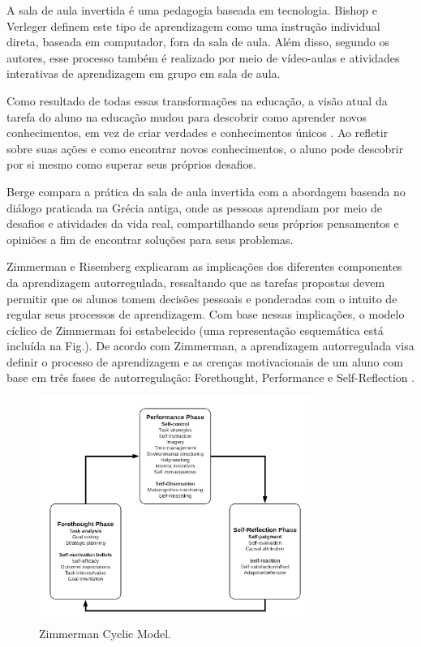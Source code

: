 A sala de aula invertida é uma pedagogia baseada em tecnologia. Bishop e Verleger\cite {bishop_flipped_2013} definem este tipo de aprendizagem como uma instrução individual direta, baseada em computador, fora da sala de aula. Além disso, segundo os autores, esse processo também é realizado por meio de vídeo-aulas e atividades interativas de aprendizagem em grupo em sala de aula.

Como resultado de todas essas transformações na educação, a visão atual da tarefa do aluno na educação mudou para descobrir como aprender novos conhecimentos, em vez de criar verdades e conhecimentos únicos \cite{ebert_school_2013}. Ao refletir sobre suas ações e como encontrar novos conhecimentos, o aluno pode descobrir por si mesmo como superar seus próprios desafios.

Berge\cite{berge_computer_1995} compara a prática da sala de aula invertida com a abordagem baseada no diálogo praticada na Grécia antiga, onde as pessoas aprendiam por meio de desafios e atividades da vida real, compartilhando seus próprios pensamentos e opiniões a fim de encontrar soluções para seus problemas.

Zimmerman e Risemberg \cite{zimmerman_chapter_1997} explicaram as implicações dos diferentes componentes da aprendizagem autorregulada, ressaltando que as tarefas propostas devem permitir que os alunos tomem decisões pessoais e ponderadas com o intuito de regular seus processos de aprendizagem. Com base nessas implicações, o modelo cíclico de Zimmerman \cite{zimmerman_chapter_2000} foi estabelecido (uma representação esquemática está incluída na Fig.). De acordo com Zimmerman, a aprendizagem autorregulada visa definir o processo de aprendizagem e as crenças motivacionais de um aluno com base em três fases de autorregulação: Forethought, Performance e Self-Reflection \cite {zimmerman_investigating_2008}.

\begin{figure}[!t]
\centering
\includegraphics[width=3.5in]{chaps/Images/Zimmerman.png}
\caption{Zimmerman Cyclic Model.}
\label{fig:Zimmerman Model}
\end{figure}

